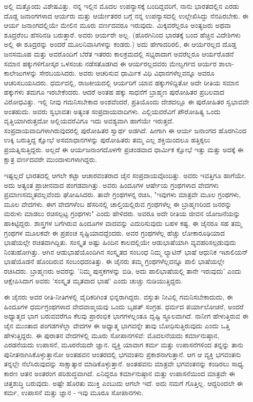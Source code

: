 ಅಲ್ಲಿ ಮತ್ತೊಂದು ವಿಶೇಷವಿತ್ತು. ನನ್ನ ಇಲ್ಲಿನ ಮೊದಲ ಉಪನ್ಯಾಸಕ್ಕೆ ಬಂದಿದ್ದವರಿಗೆ, ನಾನು ಭಾರತದಲ್ಲಿನ ಎರಡು ದೊಡ್ಡ ಜನಾಂಗಗಳಾದ ಆರ್ಯರು ಮತ್ತು ಆರ್ಯೇತರರ ಬಗ್ಗೆ ನನ್ನ ಉಪನ್ಯಾಸದಲ್ಲಿ ಉಲ್ಲೇಖಿಸಿದ್ದು ನೆನಪಿರಬೇಕು. ಈ ಆರ್ಯ ಜನಾಂಗದಲ್ಲಿಯೇ ಮೇಲಿನ ಮೂರು ವರ್ಣದವರೂ ಇರುವುದು. ಮಿಕ್ಕವರೆಲ್ಲರೂ ಅಂತ್ಯಜರು ಅಥವಾ ಶೂದ್ರರೆಂಬ ಹೆಸರಿನಡಿ ಬರುತ್ತಾರೆ. ಅವರು ಆರ್ಯರೇ ಅಲ್ಲ. (ಹೊರಗಿನಿಂದ ಭಾರತಕ್ಕೆ ಬಂದ ಹೆಚ್ಚಿನ ವಿದೇಶಿಗಳು ಅಲ್ಲಿ ಈ ಶೂದ್ರರನ್ನು ಅಂದರೆ ಮೂಲನಿವಾಸಿಗಳನ್ನು ಕಂಡರು.) ಅದು ಹೇಗಾದರಿರಲಿ, ಈ ಆರ್ಯರಲ್ಲದ ದೊಡ್ಡ ಜನಸಮೂಹ ಮತ್ತು ಅವರೊಂದಿಗೆ ಬೆರೆತ ಇತರರು ಕಾಲಕ್ರಮದಲ್ಲಿ ಸಭ್ಯರಾದಾಗ ಅವರೆಲ್ಲರೂ ಆರ್ಯರೊಡನೆ ಸಮಾನ ಹಕ್ಕುಗಳಿಗೋಸ್ಕರ ಒಳಸಂಚು ನಡೆಸತೊಡಗಿದ ಈ ಆರ್ಯರಲ್ಲದವರು ಮೇಲ್ವರ್ಗದ ಆರ್ಯರ ಶಾಲಾ-ಕಾಲೇಜುಗಳನ್ನು ಸೇರಬಯಸಿದರು. ಅವರು ಆಚರಿಸುವ ಧಾರ್ಮಿಕ ವಿಧಿ ವಿಧಾನಗಳೆಲ್ಲವನ್ನೂ ಅವರೂ ಆಚರಿಸಬಯಸಿದರು. ಧರ್ಮದಲ್ಲಿ, ರಾಜಕೀಯದಲ್ಲಿ ಆರ್ಯರಿಗೆ ಯಾವ ಹಕ್ಕುಗಳಿದ್ದಿತೋ ಅದೇ ರೀತಿಯ ಸಮಾನ ಹಕ್ಕುಗಳು ತಮಗೂ ಇರಬೇಕೆಂದರು. ಆದರೆ ಅಂತಹ ಹಕ್ಕು ಸಾಧನೆಗೆ ಬ್ರಾಹ್ಮಣ ಪುರೋಹಿತರ ಪ್ರಬಲವಾದ ವಿರೋಧವಿತ್ತು. ಇಲ್ಲಿ ನೀವು ಗಮನಿಸಬೇಕಾದ ಅಂಶವೆಂದರೆ, ಪ್ರತಿಯೊಂದು ದೇಶದಲ್ಲೂ ಈ ಪುರೋಹಿತರ ಸ್ವಭಾವವೇ ಅಂತಹುದು. ಅವರು ಸ್ವಭಾವತಃ ಅತ್ಯಂತ ಸಂಪ್ರದಾಯವಾದಿಗಳು. ಎಲ್ಲಿಯವರೆವಿಗೆ ಪೌರೋಹಿತ್ಯ ಒಂದು ವೃತ್ತಿಯಾಗಿರುತ್ತದೋ ಅಲ್ಲಿಯವರೆವಿಗೂ ಇದು ಅವಶ್ಯವಾಗಿ ಹಾಗೆಯೇ ಇರುತ್ತದೆ. ಸಂಪ್ರದಾಯವಾದಿಗಳಾಗಿರುವುದರಲ್ಲಿ ಪುರೋಹಿತರ ಸ್ವಾರ್ಥ ಅಡಗಿದೆ. ಹೀಗಾಗಿ ಈ ಆರ್ಯ ಜನಾಂಗದ ಹೊರಗಿನಿಂದ ಉಕ್ಕಿ ಬರುತ್ತಿದ್ದ ಕ್ಷೋಭೆ ಅಸಮಾಧಾನಗಳನ್ನು ಪುರೋಹಿತರು ತಮ್ಮ ಎಲ್ಲ ಶಕ್ತಿಯಿಂದಲೂ ಹತ್ತಿಕ್ಕಲು ಪ್ರಯತ್ನಿಸುತ್ತಿದ್ದರು. ಅಲ್ಲದೆ ಈ ಆರ್ಯಜನಾಂಗದೊಳಗೇ ಪ್ರಚಂಡವಾದ ಧಾರ್ಮಿಕ ಕ್ಷೋಭೆ ಇತ್ತು ಮತ್ತು ಅದಕ್ಕೆ ಈ ಕ್ಷಾತ್ರ ವರ್ಣದವರೇ ಮುಂದಾಳುಗಳಾಗಿದ್ದರು.

ಇಷ್ಟಲ್ಲದೆ ಭಾರತದಲ್ಲಿ ಆಗಲೇ ಕಟ್ಟಾ ಆಚಾರವಂತರಾದ ಜೈನ ಸಂಪ್ರದಾಯವೊಂದಿತ್ತು. ಅವರು ಇವತ್ತಿಗೂ ಹಾಗೆಯೇ. ಅದು ಅತ್ಯಂತ ಪ್ರಾಚೀನವಾದ ಪಂಗಡವಾಗಿತ್ತು. ಅವರು ಹಿಂದೂಗಳ ಆರ್ಷೇಯ ಗ್ರಂಥಗಳಾದ ವೇದಗಳು ಪ್ರಮಾಣಸಮ್ಮತವಲ್ಲವೆಂದು ಘೋಷಿಸಿದರು. ತಾವೇ ಗ್ರಂಥಗಳನ್ನ ರಚಿಸಿ, "ಇವುಗಳು ಮಾತ್ರವೇ ಮೂಲ ಗ್ರಂಥಗಳು, ಮೂಲ ವೇದಗಳು. ಈಗ ವೇದಗಳೆಂಬ ಹೆಸರಿನಲ್ಲಿ ಚಾಲ್ತಿಯಲ್ಲಿರುವ ಗ್ರಂಥಗಳೆಲ್ಲ ಈ ಬ್ರಾಹ್ಮಣರಿಂದ ಜನರನ್ನು ಮರುಳು ಮಾಡಲು ರಚಿಸಲ್ಪಟ್ಟ ಗ್ರಂಥಗಳು" ಎಂದು ಹೇಳಿದರು. ಅವರೂ ಅದೇ ರೀತಿಯ ಜೀವನ ಯೋಜನೆಯನ್ನು ಹಾಕಿಟ್ಟಿದ್ದರು. ಶಾಸ್ತ್ರಗಳ ಬಗೆಗಿರುವ ಹಿಂದೂಗಳ ವಾದವನ್ನು ಎದುರಿಸುವುದು ಬಹಳ ಕಷ್ಟ. ಈ ಜೈನರೂ ಸಹ ತಮ್ಮ ಗ್ರಂಥಗಳ ಮೂಲಕವೇ ಈ ಪ್ರಪಂಚ ಸೃಷ್ಟಿಯಾದದ್ದೆಂದರು. ಅವರ ಗ್ರಂಥಗಳೆಲ್ಲ ಹೆಚ್ಚು ಲೋಕಾರೂಢಿಯಾದ ಭಾಷೆಯಲ್ಲೇ ರಚಿತವಾಗಿದ್ದಿತು. ಸಂಸ್ಕೃತ ಅಷ್ಟು ಹಿಂದಿನ ಕಾಲದಲ್ಲಿಯೇ ಆಡುಭಾಷೆಯಾಗಿ ವ್ಯವಹರಿಸಲ್ಪಡುವುದು ನಿಂತುಹೋಗಿತ್ತು. ಆಗಿನ ಆಡುಭಾಷೆಯೊಂದಿಗಿನ ಸಂಸ್ಕೃತದ ಸಂಬಂಧ ನಿಮ್ಮ ಲ್ಯಾಟಿನ್ ಭಾಷೆ ಆಧುನಿಕ ಇಟಾಲಿಯನ್ ಭಾಷೆಯೊಡನೆ ಹೊಂದಿರುವ ಸಂಬಂಧದಂತಿತ್ತು. ಈ ಜೈನರು ತಮ್ಮ ಗ್ರಂಥಗಳೆಲ್ಲವನ್ನೂ ಪಾಲಿ ಭಾಷೆಯಲ್ಲೇ ರಚಿಸಿದರು. ಬ್ರಾಹ್ಮಣರು ಅವರನ್ನು 'ನಿಮ್ಮ ಪುಸ್ತಕಗಳನ್ನು ಬಿಡಿ, ಅದು ಪಾಲಿಭಾಷೆಯಲ್ಲಿ ತಾನೇ ಇರುವುದು' ಎಂದು ಆಕ್ಷೇಪಿಸಿದಾಗ ಅವರು 'ಸಂಸ್ಕೃತ ಮೃತವಾದ ಭಾಷೆ' ಎಂದು ಚುಚ್ಚು ನುಡಿಯುತ್ತಿದ್ದರು.

ಈ ಜೈನರು ಅವರ ರೀತಿ-ನೀತಿಗಳಲ್ಲಿ ವೈದಿಕರಿಗಿಂತ ಭಿನ್ನರಾಗಿದ್ದರು. ವಸ್ತುತಃ ನೀವಿಲ್ಲಿ ಗಮನಿಸಬೇಕಾದುದು, ಈ ಹಿಂದೂಗಳ ಧರ್ಮಗ್ರಂಥಗಳಾದ ವೇದವಾಙ್ಮಯವು ಒಂದು ಬೃಹತ್ ಸಂಗ್ರಹ. ಧರ್ಮದ ಪರ್ಯಾಲೋಚನೆ, ಅಂದರೆ ಅಧ್ಯಾತ್ಮದ ಭಾಗ ಬರುವವರೆಗೂ ಕೆಲವು ಪ್ರಾರಂಭಿಕ ಭಾಗಗಳಲ್ಲಂತೂ ದೃಷ್ಟಿ ಸ್ಥೂಲವಾಗಿದೆ. ನಾನೀಗ ಹೇಳುತ್ತಿರುವ ಈ ಜೈನ ಮುಂತಾದ ಪಂಗಡಗಳೆಲ್ಲಾ ವೇದಗಳ ಈ ಅಧ್ಯಾತ್ಮ ಭಾಗವನ್ನೇ ತಾವು ಬೋಧಿಸುತ್ತಿರುವುದು ಎಂದು ಒತ್ತಿ ಹೇಳುತ್ತಿದ್ದರು. ಈ ಪುರಾತನ ವೇದಗಳಲ್ಲಿ ಮೂರು ಸೋಪಾನಗಳಿವೆ: ಮೊದಲನೆಯದು ಕರ್ಮಾನುಷ್ಠಾನ, ಎರಡನೆಯದು ಉಪಾಸನೆ, ಮೂರನೆಯದೇ ಜ್ಞಾನ. ವ್ಯಕ್ತಿ ಯಾವಾಗ ಕರ್ಮ ಮತ್ತು ಉಪಾಸನೆಗಳಿಂದ ತನ್ನನ್ನು ತಾನು ಪುನೀತನಾಗಿಸಿಕೊಳ್ಳುತ್ತಾನೋ ಅಂತಹವನ ಆಂತರದಲ್ಲಿ ಭಗವಂತನು ಪ್ರಕಾಶನಾಗುತ್ತಾನೆ. ಆಗ ಆ ವ್ಯಕ್ತಿ ಭಗವಂತನು ತನ್ನಲ್ಲೇ ನೆಲೆಸಿರುವುದನ್ನು ಸಾಕ್ಷಾತ್ಕಾರ ಮಾಡಿಕೊಳ್ಳುತ್ತಾನೆ. ಅಂತಹವನು ಮಾತ್ರವೇ ಭಗವಂತನನ್ನು ಕಂಡಿರಲು ಸಾಧ್ಯ. ಕಾರಣ ಆತನ ಅಂತರಂಗ ಪರಿಶುದ್ಧವಾಗಿದೆ. ಏನಿದ್ದರೂ ಕರ್ಮಾನುಷ್ಠಾನ ಮತ್ತು ಉಪಾಸನೆಯಿಂದ ಮಾತ್ರವೇ ಈ ಚಿತ್ತಶುದ್ಧಿ ಬರುವುದು. ಅಷ್ಟೇ ಹೊರತು ಮುಕ್ತಿ ಎಂಬುದು ಆಗಲೇ ಇದೆ. ಅದು ನಮಗೆ ಗೊತ್ತಿಲ್ಲ. ಆದ್ದರಿಂದಲೇ ಈ ಕರ್ಮ, ಉಪಾಸನೆ ಮತ್ತು ಜ್ಞಾನ - ಇವು ಮೂರೂ ಸೋಪಾನಗಳು.

